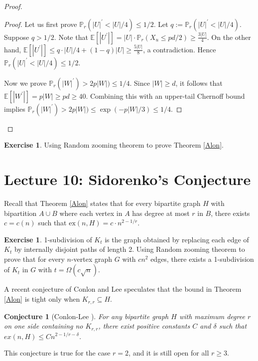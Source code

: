 \documentclass{article}
\newtheorem{conjecture}[theorem]{Conjecture}
\theoremstyle{definition}
\newtheorem{exercise}[theorem]{Exercise}
\newcommand{\ex}{\mathrm{ex}}
\begin{document}
\begin{proof}
\begin{proof}
Let us first prove $\mathbb{P}_r(|U|^\prime< |U|/4)\leq 1/2$. Let $q:=\mathbb{P}_r(|U|^\prime< |U|/4)$. Suppose $q>1/2$. Note that $\mathbb{E}[|U^\prime|]=|U|\cdot \mathbb{P}_r(X_u\leq pd/2)\geq \frac{3|U|}{4}$. On the other hand, $\mathbb{E}[|U^\prime|]\leq q\cdot |U|/4+(1-q) |U|\geq \frac{5|U|}{8}$, a contradiction. Hence $\mathbb{P}_r(|U|^\prime< |U|/4)\leq 1/2$.

Now we prove $\mathbb{P}_r(|W|^\prime)> 2p|W|)\leq 1/4$. Since $|W|\geq d$, it follows that 
$\mathbb{E}[|W^\prime|]=p|W|\geq pd \geq 40$. Combining this with an upper-tail Chernoff bound implies $\mathbb{P}_r(|W|^\prime)> 2p|W|)\leq \exp(-p|W|/3)\leq 1/4$. 
\end{proof} 
\end{proof}

\begin{exercise}
    Using Random zooming theorem to prove Theorem \ref{Alon}.
\end{exercise}

\newpage
\section{Lecture 10: Sidorenko's Conjecture}

Recall that Theorem \ref{Alon} states that for every bipartite graph $H$ with bipartition $A\cup B$ where each vertex in $A$ has degree at most $r$ in $B$, there exists $c=c(n)$ such that $\ex(n,H)=c\cdot n^{2-1/r}$. 

\begin{exercise}
    1-subdivision of $K_t$ is the graph obtained by replacing each edge of $K_t$ by internally disjoint paths of length 2. Using Random zooming theorem to prove that for every $n$-vertex graph $G$ with $cn^2$ edges, there exists a 1-subdivision of $K_t$ in $G$ with $t=\Omega(c\sqrt{n})$.
\end{exercise}

A recent conjecture of Conlon and Lee \cite{conlon2021extremal} speculates that the bound in Theorem \ref{Alon} is tight only when $K_{r,r}\subseteq H$.

\begin{conjecture}[Conlon-Lee \cite{conlon2021extremal}]
    For any bipartite graph $H$ with maximum degree $r$ on one side containing no $K_{r,r}$, there exist positive constants $C$ and $\delta$ such that $ex(n, H) \leq Cn^{2-1/r-\delta}$.
\end{conjecture}

This conjecture is true for the case $r=2$, and it is still open for all $r\geq 3$.
\end{document}
